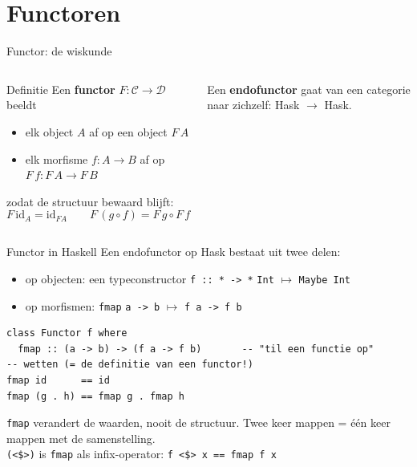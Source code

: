 \documentclass[aspectratio=169,11pt]{beamer}
\newcommand{\hs}{\lstinline[style=hsinline]}
\begin{document}
\section{Functoren}

\begin{frame}[fragile]{Functor: de wiskunde}
  \begin{columns}[c]
    \begin{block}{Definitie}
      Een \textbf{functor} $F : \mathcal{C} \to \mathcal{D}$ beeldt
      \begin{itemize}
        \item elk object $A$ af op een object $F\,A$
        \item elk morfisme $f : A \to B$ af op $F\,f : F\,A \to F\,B$
      \end{itemize}
      zodat de structuur bewaard blijft:
      \[
        F\,\mathrm{id}_A = \mathrm{id}_{F A}
        \qquad
        F\,(g \circ f) = F\,g \circ F\,f
      \]
    \end{block}
    Een \textbf{endofunctor} gaat van een categorie naar zichzelf:
    \alert{Hask $\to$ Hask}.
    \centering
  \end{columns}
\end{frame}

\begin{frame}[fragile]{Functor in Haskell}
  Een endofunctor op Hask bestaat uit twee delen:
  \begin{itemize}
    \item op objecten: een \alert{typeconstructor} \hs{f :: * -> *} \hfill \hs{Int} $\mapsto$ \hs{Maybe Int}
    \item op morfismen: \alert{\hs{fmap}} \hfill \hs{a -> b} $\mapsto$ \hs{f a -> f b}
  \end{itemize}
\begin{lstlisting}
class Functor f where
  fmap :: (a -> b) -> (f a -> f b)       -- "til een functie op"
-- wetten (= de definitie van een functor!)
fmap id      == id
fmap (g . h) == fmap g . fmap h
\end{lstlisting}
  \pause
  \hs{fmap} verandert de \alert{waarden}, nooit de \alert{structuur}.
  Twee keer mappen = één keer mappen met de samenstelling.\\[4pt]
  \hs{(<$>)} is \hs{fmap} als infix-operator: \hs{f <$> x == fmap f x}
\end{frame}
 
\end{document}
